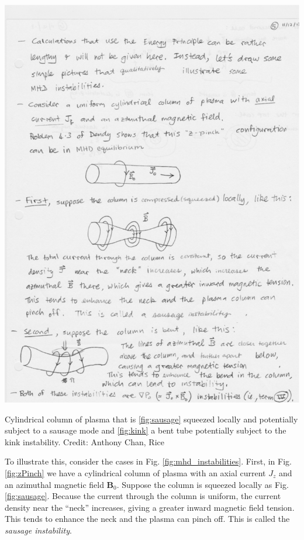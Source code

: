 \begin{marginfigure}
{		\includegraphics[width=\columnwidth]{figures/mhd_instability_kink.pdf}
		\label{fig:kink}
		}
		\caption{Cylindrical column of plasma that is \ref{fig:sausage} squeezed locally and potentially subject to a sausage mode and \ref{fig:kink} a bent tube potentially subject to the kink instability. Credit: Anthony Chan, Rice}
		\label{fig:mhd_instabilities}
	\end{marginfigure}

	To illustrate this, consider the cases in Fig. \ref{fig:mhd_instabilities}. First, in Fig. \ref{fig:zPinch} we have a cylindrical column of plasma with an axial current $J_z$ and an azimuthal magnetic field $\mathbf{B}_0$. Suppose the column is squeezed locally as Fig. \ref{fig:sausage}. Because the current through the column is uniform, the current density near the ``neck'' increases, giving a greater inward magnetic field tension. This tends to enhance the neck and the plasma can pinch off. This is called the \textit{sausage instability}.

